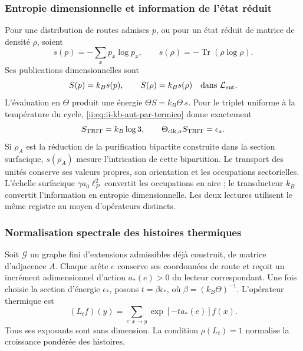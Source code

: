 \subsubsection{Entropie dimensionnelle et information de l'état réduit}

Pour une distribution de routes admises \(p\), ou pour un état réduit de matrice de densité \(\rho\), soient
\[
 s(p)=-\sum_xp_x\log p_x,\qquad
 s(\rho)=-\operatorname{Tr}(\rho\log\rho).
\]
Ses publications dimensionnelles sont
\begin{equation}
 S(p)=k_Bs(p),\qquad S(\rho)=k_Bs(\rho)
 \quad\text{dans }\mathcal L_{\rm ent}.
 \label{ii:eq:ii-kb-aut-entropia}
\end{equation}
L'évaluation en \(\Theta\) produit une énergie
\(\Theta S=k_B\Theta\,s\). Pour le triplet uniforme à la température
du cycle, \eqref{ii:eq:ii-kb-aut-par-termico} donne exactement
\[
 S_{\rm TRIT}=k_B\log3,\qquad
 \Theta_{{\rm clk},a}S_{\rm TRIT}=\epsilon_a.
\]
Si \(\rho_A\) est la réduction de la purification bipartite construite dans la section surfacique, \(s(\rho_A)\) mesure l'intrication de cette bipartition. Le transport des unités conserve ses valeurs propres, son orientation et les occupations sectorielles. L'échelle surfacique \(\gamma a_0\ell_P^2\) convertit les occupations en aire ; le transducteur \(k_B\) convertit l'information en entropie dimensionnelle. Les deux lectures utilisent le même registre au moyen d'opérateurs distincts.

\subsubsection{Normalisation spectrale des histoires thermiques}

Soit \(\mathcal G\) un graphe fini d'extensions admissibles déjà
construit, de matrice d'adjacence \(A\). Chaque arête \(e\) conserve
ses coordonnées de route et reçoit un incrément adimensionnel d'action
\(a_*(e)>0\) du lecteur correspondant. Une fois choisie la section d'énergie
\(\epsilon_*\), posons \(t=\beta\epsilon_*\), où
\(\beta=(k_B\Theta)^{-1}\). L'opérateur thermique est
\begin{equation}
 (L_tf)(y)=\sum_{e:x\to y}\exp[-t a_*(e)]f(x).
 \label{ii:eq:ii-kb-aut-operador}
\end{equation}
Tous ses exposants sont sans dimension. La condition
\(\rho(L_t)=1\) normalise la croissance pondérée des histoires.

